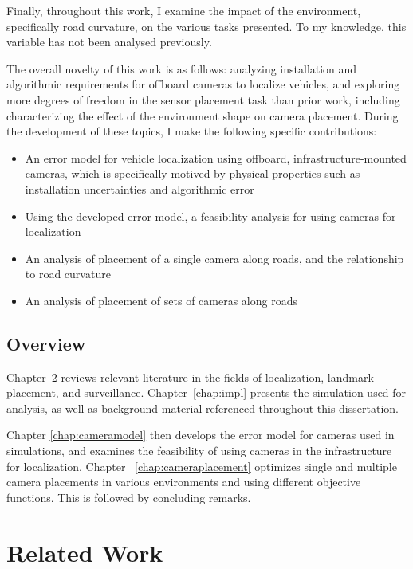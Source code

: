 \documentclass[a4paper,12pt,twoside,openright]{report}
\begin{document}
Finally, throughout this work, I examine the impact of the environment, specifically
road curvature, on the various tasks presented. To my knowledge, this variable has not been
analysed previously.

The overall novelty of this work is as follows: analyzing installation and algorithmic requirements
for offboard cameras to localize vehicles, and exploring more degrees of freedom in
the sensor placement task than prior work, including characterizing the 
effect of the environment shape on camera placement. During the development of these topics,
I make the following specific contributions:
\begin{itemize}
    \item An error model for vehicle localization using offboard, infrastructure-mounted cameras, which is
    specifically motived by physical properties such as installation uncertainties and algorithmic error
    \item Using the developed error model, a feasibility analysis for using cameras for localization
    \item An analysis of placement of a single camera along roads, and the relationship to road curvature
    \item An analysis of placement of sets of cameras along roads
\end{itemize}



\section{Overview}

Chapter~\ref{chap:relatedwork} reviews relevant literature in the fields of
localization, landmark placement, and surveillance. Chapter~\ref{chap:impl} presents 
the simulation used for analysis, as well as background material referenced throughout 
this dissertation.

Chapter \ref{chap:cameramodel} then develops the error model for cameras
used in simulations, and examines the feasibility of using cameras in the infrastructure for localization.
Chapter ~\ref{chap:cameraplacement} optimizes single and multiple camera placements
in various environments and using different objective functions. This is followed by concluding remarks.

\chapter{Related Work} 
\label{chap:relatedwork}
\end{document}
